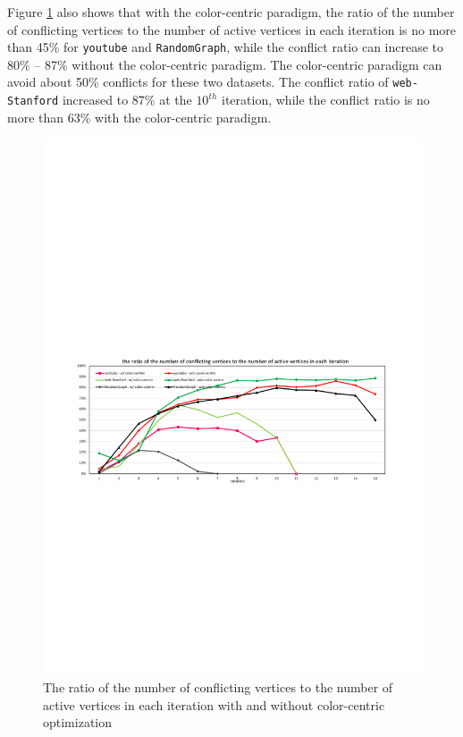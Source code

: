 Figure \ref{fig:scale} also shows that with the color-centric paradigm, the ratio of the number of conflicting vertices to the number of active vertices in each iteration is no more than 45\% for \texttt{youtube} and \texttt{RandomGraph}, while the conflict ratio can increase to 80\% -- 87\% without the color-centric paradigm. The color-centric paradigm can avoid about 50\% conflicts for these two datasets. The conflict ratio of \texttt{web-Stanford} increased to 87\% at the $10^{th}$ iteration, while the conflict ratio is no more than 63\% with the color-centric paradigm.

\begin{figure}[h]
	\centering
		\includegraphics[scale=0.4]{figure/conflict_Feluca.pdf}
	\caption{The ratio of the number of conflicting vertices to the number of active vertices in each iteration with and without color-centric optimization}
	\label{fig:scale}%
\end{figure}

